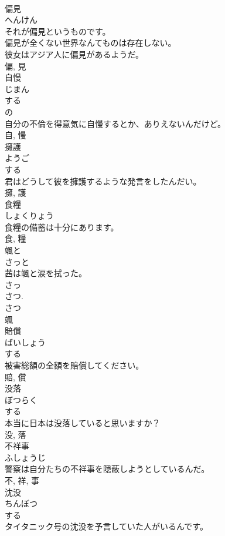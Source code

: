 \documentclass[8pt]{extreport}
\begin{document}
\begin{CJK}{UTF8}{min}
\\	偏見	
\\	へんけん	
\\	それが偏見というものです。	
\\	偏見が全くない世界なんてものは存在しない。	
\\	彼女はアジア人に偏見があるようだ。	
\\	偏, 見	
\\	自慢	
\\	じまん	
\\	する 
\\	の 
\\	自分の不倫を得意気に自慢するとか、ありえないんだけど。	
\\	自, 慢	
\\	擁護	
\\	ようご	
\\	する 
\\	君はどうして彼を擁護するような発言をしたんだい。	
\\	擁, 護	
\\	食糧	
\\	しょくりょう	
\\	食糧の備蓄は十分にあります。	
\\	食, 糧	
\\	颯と	
\\	さっと	
\\	茜は颯と涙を拭った。	
\\	さっ 
\\	さつ. 
\\	さつ 
\\	颯	
\\	賠償	
\\	ばいしょう	
\\	する 
\\	被害総額の全額を賠償してください。	
\\	賠, 償	
\\	没落	
\\	ぼつらく	
\\	する 
\\	本当に日本は没落していると思いますか？	
\\	没, 落	
\\	不祥事	
\\	ふしょうじ	
\\	警察は自分たちの不祥事を隠蔽しようとしているんだ。	
\\	不, 祥, 事	
\\	沈没	
\\	ちんぼつ	
\\	する 
\\	タイタニック号の沈没を予言していた人がいるんです。	

\end{CJK}
\end{document}
